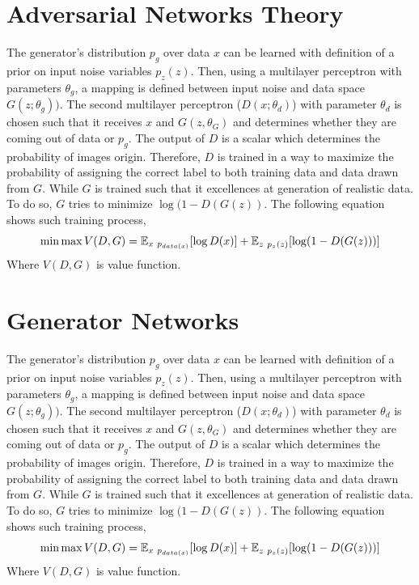 \section{Adversarial Networks Theory }
The generator’s distribution $p_g$ over data $x$ can be learned with definition of a prior on input noise variables $p_z(z)$. Then, using a multilayer perceptron with parameters $\theta_g$, a mapping is defined between input noise and data space  $G(z; \theta_g))$. The second multilayer perceptron ($D(x; \theta_d)$) with parameter $\theta_d$ is chosen such that it receives $x$ and $G(z, \theta_G)$ and determines whether they are coming out of data or $p_g$. The output of $D$ is a scalar which determines the probability of images origin. Therefore, $D$ is trained in a way to maximize the probability of assigning the correct label to both training data and data drawn from $G$. While $G$ is trained such that it excellences at generation of realistic data. To do so, $G$ tries to minimize $\log(1-D(G(z))$. The following equation shows such training process,
$$
\min \max V(D,G) = \mathbb{E}_{x ~ p_{data(x)}} [\log D(x) ] + \mathbb{E}_{z~p_z(z)}[ \log(1 - D(G(z)))]
$$
Where $V(D, G)$ is value function. 

\section{Generator Networks }
The generator’s distribution $p_g$ over data $x$ can be learned with definition of a prior on input noise variables $p_z(z)$. Then, using a multilayer perceptron with parameters $\theta_g$, a mapping is defined between input noise and data space  $G(z; \theta_g))$. The second multilayer perceptron ($D(x; \theta_d)$) with parameter $\theta_d$ is chosen such that it receives $x$ and $G(z, \theta_G)$ and determines whether they are coming out of data or $p_g$. The output of $D$ is a scalar which determines the probability of images origin. Therefore, $D$ is trained in a way to maximize the probability of assigning the correct label to both training data and data drawn from $G$. While $G$ is trained such that it excellences at generation of realistic data. To do so, $G$ tries to minimize $\log(1-D(G(z))$. The following equation shows such training process,
$$
\min \max V(D,G) = \mathbb{E}_{x ~ p_{data(x)}} [\log D(x) ] + \mathbb{E}_{z~p_z(z)}[ \log(1 - D(G(z)))]
$$
Where $V(D, G)$ is value function. 

